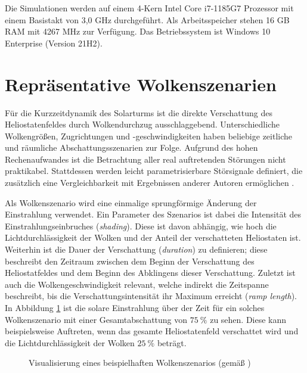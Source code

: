 Die Simulationen werden auf einem 4-Kern Intel Core i7-1185G7 Prozessor mit einem Basistakt von 3,0 GHz durchgeführt.
Als Arbeitsspeicher stehen 16 GB RAM mit 4267 MHz zur Verfügung.
Das Betriebssystem ist Windows 10 Enterprise (Version 21H2).


\section{Repräsentative Wolkenszenarien} \label{sec_reprWolkenszenarien}
Für die Kurzzeitdynamik des Solarturms ist die direkte Verschattung des Heliostatenfeldes durch Wolkendurchzug ausschlaggebend.
Unterschiedliche Wolkengrößen, Zugrichtungen und -geschwindigkeiten haben beliebige zeitliche und räumliche Abschattungsszenarien zur Folge.
Aufgrund des hohen Rechenaufwandes ist die Betrachtung aller real auftretenden Störungen nicht praktikabel.
Stattdessen werden leicht parametrisierbare Störsignale definiert, die zusätzlich eine Vergleichbarkeit mit Ergebnissen anderer Autoren ermöglichen \cite[S.60]{DissHirsch}.

Als Wolkenszenario wird eine einmalige sprungförmige Änderung der Einstrahlung verwendet.
Ein Parameter des Szenarios ist dabei die Intensität des Einstrahlungseinbruches (\textit{shading}).
Diese ist davon abhängig, wie hoch die Lichtdurchlässigkeit der Wolken und der Anteil der verschatteten Heliostaten ist.
Weiterhin ist die Dauer der Verschattung (\textit{duration}) zu definieren; diese beschreibt den Zeitraum zwischen dem Beginn der Verschattung des Heliostatfeldes und dem Beginn des Abklingens dieser Verschattung.
Zuletzt ist auch die Wolkengeschwindigkeit relevant, welche indirekt die Zeitspanne beschreibt, bis die Verschattungsintensität ihr Maximum erreicht (\textit{ramp length}).
In Abbildung \ref{fig_TestszenarioWolken} ist die solare Einstrahlung über der Zeit für ein solches Wolkenszenario mit einer Gesamtabschattung von $\SI{75}{\percent}$ zu sehen.
Diese kann beispielsweise Auftreten, wenn das gesamte Heliostatenfeld verschattet wird und die Lichtdurchlässigkeit der Wolken $\SI{25}{\percent}$ beträgt.

\begin{figure}[h!]
    \centering
    \setlength{\fboxsep}{1pt}
    \setlength{\fboxrule}{1pt}
    \caption[Visualisierung eines beispielhaften Wolkenszenarios]{Visualisierung eines beispielhaften Wolkenszenarios (gemäß \cite[S.62]{DissHirsch})}
    \label{fig_TestszenarioWolken}
\end{figure}

